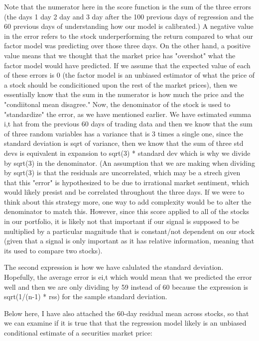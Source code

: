 \documentclass[12pt,letterpaper]{article}
\begin{document}
Note that the numerator here in the score function is the sum of the three errors (the days 1 day 2 day and 3 day after the 100 previous days of regression and the 60 previous days of understanding how our model is calibrated.) A negative value in the error refers to the stock underperforming the return compared to what our factor model was predicting over those three days. On the other hand, a positive value means that we thought that the market price has "overshot" what the factor model would have predicted. If we assume that the expected value of each of these errors is 0 (the factor model is an unbiased estimator of what the price of a stock should be condicitioned upon the rest of the market prices), then we essentially know that the sum in the numerator is how much the price and the "condiitonal mean disagree." Now, the denominator of the stock is used to "standardize" the error, as we have mentioned earlier. We have estimated summa i,t hat from the previous 60 days of trading data and then we know that the sum of three random variables has a variance that is 3 times a single one, since the standard deviation is sqrt of variance, then we know that the sum of three std devs is equivalent in expansion to sqrt(3) * standard dev which is why we divide by sqrt(3) in the denominator.
(An assumption that we are making when dividing by sqrt(3) is that the residuals are uncorrelated, which may be a strech given that this "error" is hypothesized to be due to irrational market sentiment, which would likely presist and be correlated throughout the three days. If we were to think about this strategy more, one way to add complexity would be to alter the denominator to match this. However, since this score applied to all of the stocks in our portfolio, it is likely not that important if our signal is supposed to be multiplied by a particular magnitude that is constant/not dependent on our stock (given that a signal is only important as it has relative information, meaning that its used to compare two stocks). 

The second expression is how we have calulated the standard deviation. Hopefully, the average error is ei,t which would mean that we predicted the error well and then we are only dividing by 59 instead of 60 because the expression is sqrt(1/(n-1) * rss) for the sample standard deviation. 

Below here, I have also attached the 60-day residual mean across stocks, so that we can examine if it is true that that the regression model likely is an unbiased conditional estimate of a securities market price:  
\end{document}
